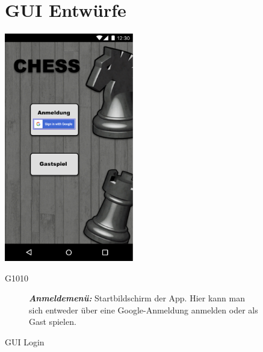 \documentclass[parskip=full]{scrartcl}
\begin{document}
\begin{figure}[htp]
	\section{GUI Entwürfe}
	
	\begin{minipage}[t]{6cm}
		\vspace{0pt}
		\includegraphics[height=100mm]{gui_login.png}
		\caption{GUI Login}
		\label{fig:GUI Login}
	\end{minipage}
	\hfill
	\begin{minipage}[t]{6cm}
		\vspace{0pt}
		\begin{description}
			 \item[G1010] \textbf{\textit{Anmeldemenü: }} Startbildschirm der App. Hier kann man sich entweder über eine Google-Anmeldung anmelden oder als Gast spielen.
		\end{description}
	\end{minipage}


\end{figure}
\end{document}
